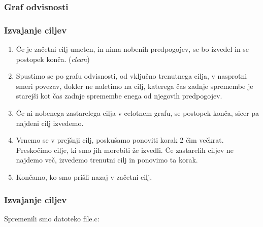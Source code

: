 \documentclass{beamer}
\begin{document}
\begin{frame}[fragile]
  \frametitle{Graf odvisnosti}
\end{frame}

\begin{frame}
  \frametitle{Izvajanje ciljev}
  
  \begin{enumerate}
  \item Če je začetni cilj umeten, in nima nobenih predpogojev, se bo
    izvedel in se postopek konča. (\textit{clean})
  \item Spustimo se po grafu odvisnosti, od vključno trenutnega cilja, v
    nasprotni smeri povezav, dokler ne naletimo na cilj, katerega čas
    zadnje spremembe je starejši kot čas zadnje spremembe enega od
    njegovih predpogojev.
  \item Če ni nobenega zastarelega cilja v celotnem grafu, se postopek
    konča, sicer pa najdeni cilj izvedemo.
  \item Vrnemo se v prejšnji cilj, poskušamo ponoviti korak 2 čim
    večkrat. Preskočimo cilje, ki smo jih morebiti že izvedli. Če
    zastarelih ciljev ne najdemo več, izvedemo trenutni cilj in
    ponovimo ta korak.
  \item Končamo, ko smo prišli nazaj v začetni cilj.
\end{enumerate}
\end{frame}

\begin{frame}[fragile]
  \frametitle{Izvajanje ciljev}
  
  Spremenili smo datoteko file.c:
\end{frame}
\end{document}
